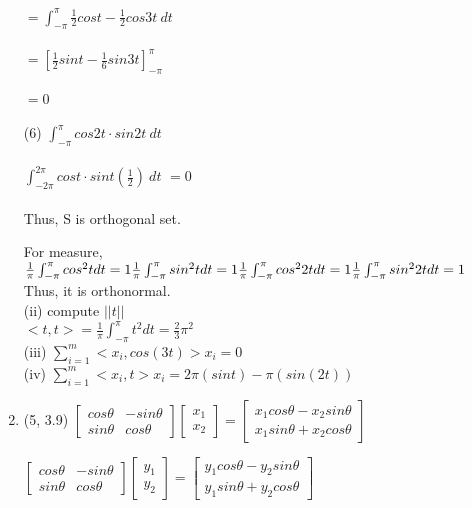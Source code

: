 \documentclass[letterpaper,12pt]{article}
\theoremstyle{definition}
\begin{document}
\begin{enumerate}
$=\int_{-\pi}^{\pi} \frac{1}{2}cost - \frac{1}{2}cos3t \ dt $ 
\\
\\
$=[\frac{1}{2}sint-\frac{1}{6}sin3t]_{-\pi}^{\pi}$
\\
\\
$=0$
\\
\\
(6)
$\int_{-\pi}^{\pi} cos2t \cdot sin2t \ dt $
\\
\\
$\int_{-2\pi}^{2\pi} cost \cdot sint (\frac{1}{2}) \ dt $
$=0$
\\
\\
Thus, S is orthogonal set.




For measure, $\frac{1}{\pi}\int_{-\pi}^{\pi} cos^2 tdt = 1 \\
\frac{1}{\pi}\int_{-\pi}^{\pi} sin^2 tdt = 1 \\
\frac{1}{\pi}\int_{-\pi}^{\pi} cos^2 2tdt = 1 \\
\frac{1}{\pi}\int_{-\pi}^{\pi} sin^2 2tdt = 1$ \\

Thus, it is orthonormal. \\

(ii) compute $||t||$\\
	$<t, t> = \frac{1}{\pi}\int_{-\pi}^{\pi} t^2 dt = \frac{2}{3}\pi^2 $ \\

(iii) $\sum_{i=1}^{m}<x_{i}, cos(3t)>x_{i} = 0$ \\

(iv) $\sum_{i=1}^{m}<x_{i}, t>x_{i} = 2\pi(sint) - \pi(sin(2t))$ \\






	\item (5, 3.9) $
		\begin{bmatrix}cos\theta & -sin\theta \\
			sin\theta & cos\theta 
			\end{bmatrix} \begin{bmatrix}
			x_{1}\\
			x_{2}
			\end{bmatrix} = \begin{bmatrix}
			x_{1}cos\theta  -x_{2}sin\theta \\
			x_{1}sin\theta  +x_{2}cos\theta 
			\end{bmatrix}$

			$
		\begin{bmatrix}cos\theta & -sin\theta \\
			sin\theta & cos\theta 
			\end{bmatrix} \begin{bmatrix}
			y_{1}\\
			y_{2}
			\end{bmatrix} = \begin{bmatrix}
			y_{1}cos\theta  -y_{2}sin\theta \\
			y_{1}sin\theta  +y_{2}cos\theta 
			\end{bmatrix}$ \\


\end{enumerate}
\end{document}
